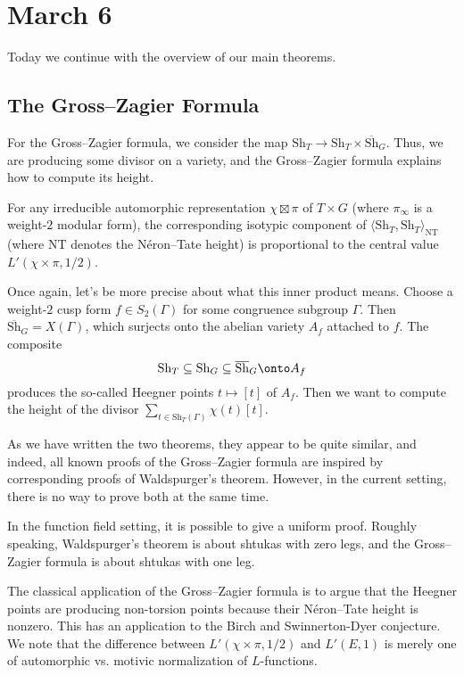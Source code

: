 \documentclass[../notes.tex]{subfiles}
\begin{document}
\section{March 6}
Today we continue with the overview of our main theorems.

\subsection{The Gross--Zagier Formula}
For the Gross--Zagier formula, we consider the map $\mathrm{Sh}_T\to\mathrm{Sh}_T\times\overline{\mathrm{Sh}}_G$. Thus, we are producing some divisor on a variety, and the Gross--Zagier formula explains how to compute its height.
\begin{theorem}
	For any irreducible automorphic representation $\chi\boxtimes\pi$ of $T\times G$ (where $\pi_\infty$ is a weight-$2$ modular form), the corresponding isotypic component of $\langle\mathrm{Sh}_T,\mathrm{Sh}_T\rangle_{\mathrm{NT}}$ (where $\mathrm{NT}$ denotes the N\'eron--Tate height) is proportional to the central value $L'(\chi\times\pi,1/2)$.
\end{theorem}
Once again, let's be more precise about what this inner product means. Choose a weight-$2$ cusp form $f\in S_2(\Gamma)$ for some congruence subgroup $\Gamma$. Then $\overline{\mathrm{Sh}}_G=X(\Gamma)$, which surjects onto the abelian variety $A_f$ attached to $f$. The composite
\[\mathrm{Sh}_T\subseteq\mathrm{Sh}_G\subseteq\overline{\mathrm{Sh}}_G\onto A_f\]
produces the so-called Heegner points $t\mapsto[t]$ of $A_f$. Then we want to compute the height of the divisor $\sum_{t\in\mathrm{Sh}_T(\Gamma)}\chi(t)[t]$.
\begin{remark}
	As we have written the two theorems, they appear to be quite similar, and indeed, all known proofs of the Gross--Zagier formula are inspired by corresponding proofs of Waldspurger's theorem. However, in the current setting, there is no way to prove both at the same time.
\end{remark}
\begin{remark}
	In the function field setting, it is possible to give a uniform proof. Roughly speaking, Waldspurger's theorem is about shtukas with zero legs, and the Gross--Zagier formula is about shtukas with one leg.
\end{remark}
\begin{remark}
	The classical application of the Gross--Zagier formula is to argue that the Heegner points are producing non-torsion points because their N\'eron--Tate height is nonzero. This has an application to the Birch and Swinnerton-Dyer conjecture. We note that the difference between $L'(\chi\times\pi,1/2)$ and $L'(E,1)$ is merely one of automorphic vs. motivic normalization of $L$-functions.
\end{remark}
\end{document}
